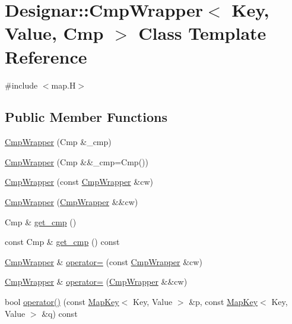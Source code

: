 \hypertarget{class_designar_1_1_cmp_wrapper}{}\section{Designar\+:\+:Cmp\+Wrapper$<$ Key, Value, Cmp $>$ Class Template Reference}
\label{class_designar_1_1_cmp_wrapper}


{\ttfamily \#include $<$map.\+H$>$}

\subsection*{Public Member Functions}
\begin{DoxyCompactItemize}
\item 
\hyperlink{class_designar_1_1_cmp_wrapper_a2fe493e155e893254b689c5933c61ebb}{Cmp\+Wrapper} (Cmp \&\+\_\+cmp)
\item 
\hyperlink{class_designar_1_1_cmp_wrapper_af471969d033f9f7b5d306a0755af43c6}{Cmp\+Wrapper} (Cmp \&\&\+\_\+cmp=Cmp())
\item 
\hyperlink{class_designar_1_1_cmp_wrapper_a7112a8dabf2f50f09173078de19ab7d2}{Cmp\+Wrapper} (const \hyperlink{class_designar_1_1_cmp_wrapper}{Cmp\+Wrapper} \&cw)
\item 
\hyperlink{class_designar_1_1_cmp_wrapper_a985bdd51796dfac3d77eff525d364a90}{Cmp\+Wrapper} (\hyperlink{class_designar_1_1_cmp_wrapper}{Cmp\+Wrapper} \&\&cw)
\item 
Cmp \& \hyperlink{class_designar_1_1_cmp_wrapper_a46bfc0600123bbb9166e870067861ded}{get\+\_\+cmp} ()
\item 
const Cmp \& \hyperlink{class_designar_1_1_cmp_wrapper_a1f4fe6315f3f96a383be1cc51909e072}{get\+\_\+cmp} () const
\item 
\hyperlink{class_designar_1_1_cmp_wrapper}{Cmp\+Wrapper} \& \hyperlink{class_designar_1_1_cmp_wrapper_a958a9c52db5cc8e9b809af0adc4f90f4}{operator=} (const \hyperlink{class_designar_1_1_cmp_wrapper}{Cmp\+Wrapper} \&cw)
\item 
\hyperlink{class_designar_1_1_cmp_wrapper}{Cmp\+Wrapper} \& \hyperlink{class_designar_1_1_cmp_wrapper_a7885c41d00b53a31f1fe4d15bcf53e00}{operator=} (\hyperlink{class_designar_1_1_cmp_wrapper}{Cmp\+Wrapper} \&\&cw)
\item 
bool \hyperlink{class_designar_1_1_cmp_wrapper_a1b715375bf0bdd7ffefdb8ada447c191}{operator()} (const \hyperlink{namespace_designar_a7394b1b25278abf7211e77b91eb5204f}{Map\+Key}$<$ Key, Value $>$ \&p, const \hyperlink{namespace_designar_a7394b1b25278abf7211e77b91eb5204f}{Map\+Key}$<$ Key, Value $>$ \&q) const
\end{DoxyCompactItemize}



